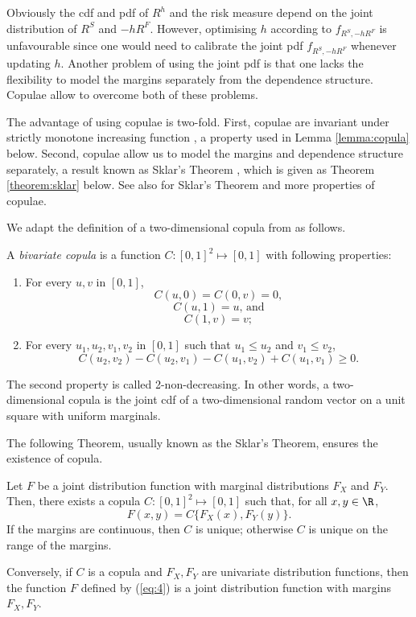 Obviously the cdf and pdf of $R^h$ and the risk measure depend on the
joint distribution of $R^S$ and $-hR^F$. However, optimising $h$
according to $f_{R^S,-hR^F}$ is unfavourable since one would need to
calibrate the joint pdf $f_{R^S,-hR^F}$ whenever updating $h$.
Another problem of using the joint pdf is that one lacks the
flexibility to model the margins separately from the dependence
structure. Copulae allow to overcome both of these problems. 

The advantage of using copulae is two-fold.
First, copulae are invariant under strictly
monotone increasing function \citep{schweizer1981nonparametric}, a
property used in Lemma \ref{lemma:copula} below. 
Second, copulae allow us to model the margins and dependence structure 
separately, a result known as Sklar's Theorem \citep{Sklar1959}, which
is given as Theorem \ref{theorem:sklar} below. 
See also \citep{Nelsen1999, joe1997multivariate, McNeil2005} for
Sklar's Theorem and more properties of copulae.

We adapt the definition of a two-dimensional copula from
 as follows. 

\begin{defi} 
  A {\em bivariate copula} is a function $C: [0,1]^2 \mapsto [0,1]$ with following properties:
  \begin{enumerate}
    \item For every $u,v$ in $[0,1]$,
      \[C(u,0)= C(0,v)=0, \]
    \[C(u,1)= u \text{, and}\]
    \[C(1,v)= v;\]
    \item For every $u_1,u_2, v_1, v_2$ in $[0,1]$ such that $u_1 \leq u_2$ and $v_1 \leq v_2$,
    \[C(u_2,v_2)-C(u_2,v_1)-C(u_1, v_2)+C(u_1,v_1) \geq 0.\]
  \end{enumerate}
  \end{defi}

The second property is called 2-non-decreasing.
In other words, a two-dimensional copula is the joint cdf of a two-dimensional random vector
on a unit square with uniform marginals.

The following Theorem, usually known as the Sklar's
Theorem, ensures the existence of copula. 

\begin{theorem}
  \label{theorem:sklar}
  Let $F$ be a joint distribution function with marginal distributions
  $F_X$ and $F_Y$. Then, there exists a copula $C:[0,1]^2 \mapsto
  [0,1]$ such that, for all $x,y\in \R$,
  \begin{equation}
    \label{eq:4}
    F(x,y)=C\{F_X(x), F_Y(y)\}.
  \end{equation}
  If the margins are continuous, then $C$ is unique; otherwise $C$ is
  unique on the range of the margins.

  Conversely, if $C$ is a copula and $F_X, F_Y$ are univariate
  distribution functions, then the function $F$ defined by (\ref{eq:4})
  is a joint distribution function with margins $F_X, F_Y$.
\end{theorem}


